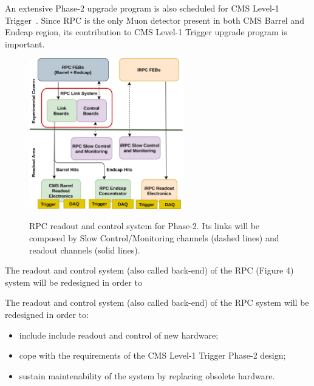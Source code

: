 An extensive Phase-2 upgrade program is also scheduled for CMS Level-1 Trigger~\cite{l1_tdr}. Since RPC is the only Muon detector present in both CMS Barrel and Endcap region, its contribution to CMS Level-1 Trigger upgrade program is important. 

\begin{figure}
    \caption{\footnotesize RPC readout and control system for Phase-2. Its links will be composed by Slow Control/Monitoring channels (dashed lines) and readout channels (solid lines). }
    \includegraphics[width=0.6\textwidth]{uioposter-images/rpc_phase2_readout.png}
    \label{rpc_phase2_readout}
\end{figure}

The readout and control system (also called back-end) of the RPC (Figure 4) system will be redesigned in order to 


\begin{tcolorbox}[colback=gray!5,colframe=gray!40!black]
    The readout and control system (also called back-end) of the RPC system will be redesigned in order to:
    \begin{itemize}
        \item include include readout and control of new hardware;
        \item cope with the requirements of the CMS Level-1 Trigger Phase-2 design;
        \item sustain maintenability of the system by replacing obsolete hardware.
    \end{itemize}
\end{tcolorbox}


